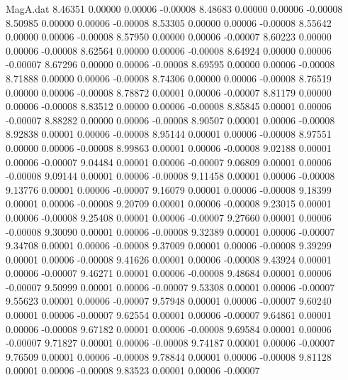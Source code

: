 \begin{filecontents}{MagA.dat}
   8.46351    0.00000    0.00006   -0.00008
   8.48683    0.00000    0.00006   -0.00008
   8.50985    0.00000    0.00006   -0.00008
   8.53305    0.00000    0.00006   -0.00008
   8.55642    0.00000    0.00006   -0.00008
   8.57950    0.00000    0.00006   -0.00007
   8.60223    0.00000    0.00006   -0.00008
   8.62564    0.00000    0.00006   -0.00008
   8.64924    0.00000    0.00006   -0.00007
   8.67296    0.00000    0.00006   -0.00008
   8.69595    0.00000    0.00006   -0.00008
   8.71888    0.00000    0.00006   -0.00008
   8.74306    0.00000    0.00006   -0.00008
   8.76519    0.00000    0.00006   -0.00008
   8.78872    0.00001    0.00006   -0.00007
   8.81179    0.00000    0.00006   -0.00008
   8.83512    0.00000    0.00006   -0.00008
   8.85845    0.00001    0.00006   -0.00007
   8.88282    0.00000    0.00006   -0.00008
   8.90507    0.00001    0.00006   -0.00008
   8.92838    0.00001    0.00006   -0.00008
   8.95144    0.00001    0.00006   -0.00008
   8.97551    0.00000    0.00006   -0.00008
   8.99863    0.00001    0.00006   -0.00008
   9.02188    0.00001    0.00006   -0.00007
   9.04484    0.00001    0.00006   -0.00007
   9.06809    0.00001    0.00006   -0.00008
   9.09144    0.00001    0.00006   -0.00008
   9.11458    0.00001    0.00006   -0.00008
   9.13776    0.00001    0.00006   -0.00007
   9.16079    0.00001    0.00006   -0.00008
   9.18399    0.00001    0.00006   -0.00008
   9.20709    0.00001    0.00006   -0.00008
   9.23015    0.00001    0.00006   -0.00008
   9.25408    0.00001    0.00006   -0.00007
   9.27660    0.00001    0.00006   -0.00008
   9.30090    0.00001    0.00006   -0.00008
   9.32389    0.00001    0.00006   -0.00007
   9.34708    0.00001    0.00006   -0.00008
   9.37009    0.00001    0.00006   -0.00008
   9.39299    0.00001    0.00006   -0.00008
   9.41626    0.00001    0.00006   -0.00008
   9.43924    0.00001    0.00006   -0.00007
   9.46271    0.00001    0.00006   -0.00008
   9.48684    0.00001    0.00006   -0.00007
   9.50999    0.00001    0.00006   -0.00007
   9.53308    0.00001    0.00006   -0.00007
   9.55623    0.00001    0.00006   -0.00007
   9.57948    0.00001    0.00006   -0.00007
   9.60240    0.00001    0.00006   -0.00007
   9.62554    0.00001    0.00006   -0.00007
   9.64861    0.00001    0.00006   -0.00008
   9.67182    0.00001    0.00006   -0.00008
   9.69584    0.00001    0.00006   -0.00007
   9.71827    0.00001    0.00006   -0.00008
   9.74187    0.00001    0.00006   -0.00007
   9.76509    0.00001    0.00006   -0.00008
   9.78844    0.00001    0.00006   -0.00008
   9.81128    0.00001    0.00006   -0.00008
   9.83523    0.00001    0.00006   -0.00007

\end{filecontents}
